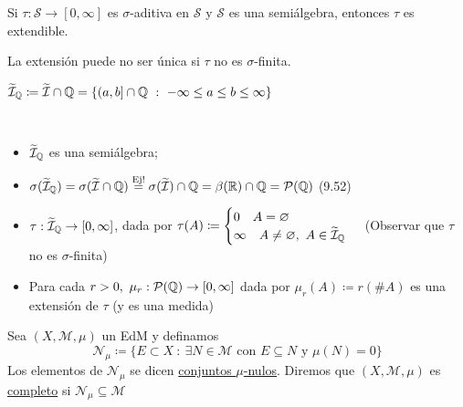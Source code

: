 
\begin{remark}
	Si $\tau : \mathscr{S} \to [0,\infty]$ es $\sigma$-aditiva en $\mathscr{S}$ y $\mathscr{S}$ es una semiálgebra, entonces $\tau$ es extendible.
\end{remark}

\begin{remark}
	La extensión puede no ser única si $\tau$ no es $\sigma$-finita.
\end{remark}
\begin{eg}
	$\widetilde{\mathcal{I}}_{\mathbb{Q}} \coloneq \widetilde{\mathcal{I}} \cap \mathbb{Q} = \{ (a,b] \cap \mathbb{Q} \ : \ -\infty \leq a \leq b \leq \infty \}$ 
\end{eg}

\begin{note}~
	\begin{itemize}
		\item $\widetilde{\mathcal{I}}_{\mathbb{Q}}$ es una semiálgebra;

		\item $\sigma (\widetilde{\mathcal{I}}_{\mathbb{Q}}) = \sigma (\widetilde{\mathcal{I}} \cap \mathbb{Q}) \stackrel{\text{Ej!}}{=} \sigma (\widetilde{\mathcal{I}}) \cap \mathbb{Q} = \beta(\mathbb{R}) \cap \mathbb{Q} = \mathcal{P}(\mathbb{Q})$ (9.52)

	\item $\tau : \widetilde{\mathcal{I}}_{\mathbb{Q}} \to [0,\infty]$, dada por $\tau(A) \coloneq \begin{cases}
			0 \quad A = \varnothing \\
			\infty \quad A \neq \varnothing,\ A \in \widetilde{\mathcal{I}}_{\mathbb{Q}}
		\end{cases}$ (Observar que $\tau$ no es $\sigma$-finita)

		\item Para cada $r > 0,\ \mu_r : \mathcal{P}(\mathbb{Q}) \to [0,\infty]$ dada por $\mu_r(A) \coloneq r(\# A)$ es una extensión de $\tau$ (y es una medida)
	\end{itemize}
\end{note}

\begin{definition}
	Sea $(X,\mathscr{M},\mu)$ un EdM y definamos 
	\[ \mathscr{N}_{\mu} \coloneq \{ E \subset X \ : \ \exists N \in \mathscr{M} \text{ con } E \subseteq N \text{ y } \mu(N) = 0 \} \] 
	Los elementos de $\mathscr{N}_{\mu}$ se dicen \underline{conjuntos $\mu$-nulos}. Diremos que $(X,\mathscr{M},\mu)$ es \underline{completo} si $\mathscr{N}_{\mu} \subseteq \mathscr{M}$
\end{definition}

